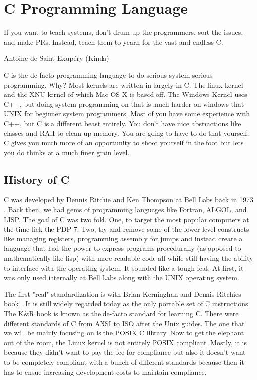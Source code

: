 \chapter{C Programming Language}

\epigraph{If you want to teach systems, don't drum up the programmers, sort the issues, and make PRs. Instead, teach them to yearn for the vast and endless C.}{Antoine de Saint-Exup\'{e}ry (Kinda)}

\gls{C} is the de-facto programming language to do serious system serious programming. Why? Most kernels are written in largely in C. The \gls{linux kernel} \cite{Love} and the XNU kernel \citet{xnukernel} of which Mac OS X is based off. The Windows Kernel uses C++, but doing system programming on that is much harder on windows that UNIX for beginner system programmers. Most of you have some experience with C++, but C is a different beast entirely. You don't have nice abstractions like classes and RAII to clean up memory. You are going to have to do that yourself. C gives you much more of an opportunity to shoot yourself in the foot but lets you do thinks at a much finer grain level.

\section{History of C}

C was developed by Dennis Ritchie and Ken Thompson at Bell Labs back in 1973 \cite{Ritchie:1993:DCL:155360.155580}. Back then, we had gems of programming languages like Fortran, ALGOL, and LISP. The goal of C was two fold. One, to target the most popular computers at the time liek the PDP-7. Two, try and remove some of the lower level constructs like managing registers, programming assembly for jumps and instead create a language that had the power to express programs procedurally (as opposed to mathematically like lisp) with more readable code all while still having the ability to interface with the operating system. It sounded like a tough feat. At first, it was only used internally at Bell Labs along with the UNIX operating system.

The first "real" standardization is with Brian Kerninghan and Dennis Ritchies book \cite{kernighan1988c}. It is still widely regarded today as the only \gls{portable} set of C instructions. The K\&R book is known as the de-facto standard for learning C.  There were different standards of C from ANSI to ISO after the Unix guides. The one that we will be mainly focusing on is the \gls{POSIX} C library. Now to get the elephant out of the room, the Linux kernel is not entirely POSIX compliant. Mostly, it is because they didn't want to pay the fee for compliance but also it doesn't want to be completely compliant with a bunch of different standards because then it has to ensue increasing development costs to maintain compliance.

